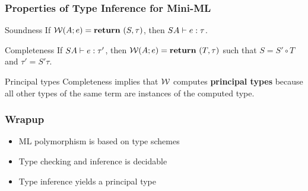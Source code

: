 \documentclass[pdftex,aspectratio=169]{beamer}
\begin{document}
\begin{frame}
  \frametitle{Properties of Type Inference for Mini-ML}
  \begin{block}{Soundness}
    If $\mathcal{W} (A; e) = \mathbf{return}\ (S, \tau)$, then $SA \vdash e : \tau$.
  \end{block}
  \begin{block}{Completeness}
    If $SA \vdash e : \tau'$, then $\mathcal{W} (A ; e) =
    \mathbf{return}\ (T, \tau)$ such that $S = S'\circ T$ and $\tau'= S'\tau$.
  \end{block}
  \begin{block}{Principal types}
    Completeness implies that $\mathcal{W}$ computes \textbf{principal types} because all other types of the same term are instances of the computed type.
  \end{block}
\end{frame}


\begin{frame}
  \frametitle{Wrapup}
  \begin{itemize}
  \item ML polymorphism is based on type schemes
  \item Type checking and inference is decidable
  \item Type inference yields a principal type
  \end{itemize}
\end{frame}
\end{document}
